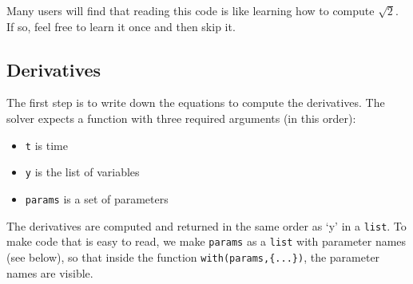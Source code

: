 \documentclass[
]{book}
\begin{document}
Many users will find that reading this code is like learning how to compute \(\sqrt{2}\). If so, feel free to learn it once and then skip it.

\hypertarget{derivatives}{%
\subsection{Derivatives}\label{derivatives}}

The first step is to write down the equations to compute the derivatives. The solver expects a function with three required arguments (in this order):

\begin{itemize}
\item
  \texttt{t} is time
\item
  \texttt{y} is the list of variables
\item
  \texttt{params} is a set of parameters
\end{itemize}

The derivatives are computed and returned in the same order as `y' in a \texttt{list}. To make code that is easy to read, we make \texttt{params} as a \texttt{list} with parameter names (see below), so that inside the function \texttt{with(params,\{...\})}, the parameter names are visible.
\end{document}
